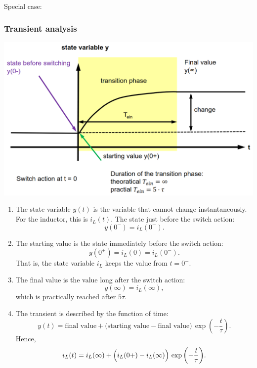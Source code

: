 \documentclass{article}
\begin{document}
Special case:

\subsubsection{Transient analysis}
\begin{center}
    \includegraphics[width=.8\textwidth]{media/transient_analysis.png}
\end{center}

\begin{enumerate}
    \item The state variable $ y(t) $ is the variable that cannot change instantaneously.
    For the inductor, this is $ i_L(t) $. The state just before the switch action:
    \[
      y(0^-) = i_L(0^-).
    \]
  
    \item The starting value is the state immediately before the switch action:
    \[
      y(0^+) = i_L(0) = i_L(0^-).
    \]
    That is, the state variable $ i_L $ keeps the value from $ t = 0^- $.
  
    \item The final value is the value long after the switch action:
    \[
      y(\infty) = i_L(\infty),
    \]
    which is practically reached after $ 5\tau $.
  
    \item The transient is described by the function of time:
    \[
      y(t) = \text{final value}
      + \bigl(\text{starting value} - \text{final value}\bigr)\, \exp{\left(-\frac{t}{\tau}\right)}.
    \]
    Hence,
    \[
      i_L(t) = i_L(\infty)
      + \Bigl(i_L(0+) - i_L(\infty)\Bigr)\, \exp{\left(-\frac{t}{\tau}\right)}.
    \]
\end{enumerate}

\newpage
{}
\end{document}

